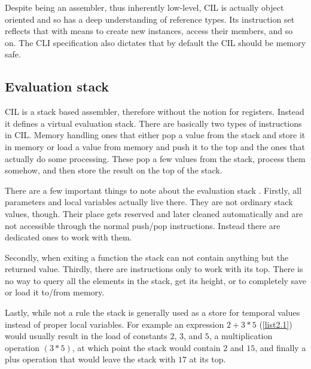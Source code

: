 Despite being an assembler, thus inherently low-level, CIL is actually object oriented and so has a deep understanding of reference types. Its instruction set reflects that with means to create new instances, access their members, and so on. The CLI specification also dictates that by default the CIL should be memory safe. 

\subsection{Evaluation stack}

CIL is a stack based assembler, therefore without the notion for registers. Instead it defines a virtual evaluation stack. There are basically two types of instructions in CIL. Memory handling ones that either pop a value from the stack and store it in memory or load a value from memory and push it to the top and the ones that actually do some processing. These pop a few values from the stack, process them somehow, and then store the result on the top of the stack.

There are a few important things to note about the evaluation stack \citep[Sec. I.12.4]{CLIEcma}. Firstly, all parameters and local variables actually live there. They are not ordinary stack values, though. Their place gets reserved and later cleaned automatically and are not accessible through the normal push/pop instructions. Instead there are dedicated ones to work with them.

Secondly, when exiting a function the stack can not contain anything but the returned value. Thirdly, there are instructions only to work with its top. There is no way to query all the elements in the stack, get its height, or to completely save or load it to/from memory.

Lastly, while not a rule the stack is generally used as a store for temporal values instead of proper local variables. For example an expression $2 + 3 * 5$ (\autoref{list2.1}) would usually result in the load of constants $2$, $3$, and $5$, a multiplication operation $(3 * 5)$, at which point the stack would contain $2$ and $15$, and finally a plus operation that would leave the stack with $17$ at its top.

